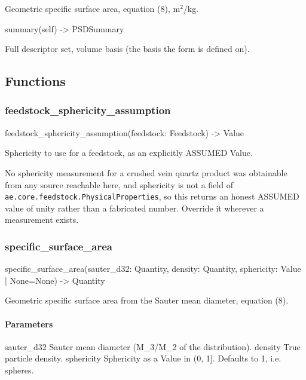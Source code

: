 \documentclass[10pt,a4paper,twoside]{report}
\begin{document}
Geometric specific surface area, equation (8), m$^{2}$/kg.

\begin{verbatimsmall}
summary(self) -> PSDSummary
\end{verbatimsmall}

Full descriptor set, volume basis (the basis the form is defined on).

\subsection*{Functions}

\subsubsection*{feedstock\_sphericity\_assumption}

\begin{verbatimsmall}
feedstock_sphericity_assumption(feedstock: Feedstock) -> Value
\end{verbatimsmall}

Sphericity to use for a feedstock, as an explicitly ASSUMED Value.

No sphericity measurement for a crushed vein quartz product was obtainable from any source reachable here, and sphericity is not a field of \texttt{ae.core.feedstock.PhysicalProperties}, so this returns an honest ASSUMED value of unity rather than a fabricated number. Override it wherever a measurement exists.

\subsubsection*{specific\_surface\_area}

\begin{verbatimsmall}
specific_surface_area(sauter_d32: Quantity, density: Quantity, sphericity: Value | None=None) -> Quantity
\end{verbatimsmall}

Geometric specific surface area from the Sauter mean diameter, equation (8).

\paragraph*{Parameters}

sauter\_d32 Sauter mean diameter (M\_3/M\_2 of the distribution). density True particle density. sphericity Sphericity as a Value in (0, 1]. Defaults to 1, i.e. spheres.
\end{document}
